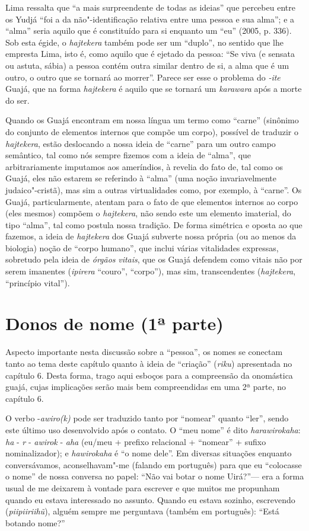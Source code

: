 Lima ressalta que ``a mais surpreendente de todas as ideias'' que percebeu
entre os Yudjá ``foi a da não"-identificação relativa entre uma pessoa e
sua alma''; e a ``alma'' seria aquilo que é constituído para si enquanto um
``eu'' (2005, p. 336). Sob esta égide, o \emph{hajtekera} também pode ser
um ``duplo'', no sentido que lhe empresta Lima, isto é, como aquilo que é
ejetado da pessoa: ``Se viva (e sensata ou astuta, sábia) a pessoa contém
outra similar dentro de si, a alma que é um outro, o outro que se
tornará ao morrer''. Parece ser esse o problema do \emph{-ite} Guajá, que
na forma \emph{hajtekera} é aquilo que se tornará um \emph{karawara}
após a morte do ser.

Quando os Guajá encontram em nossa língua um termo como ``carne''
(sinônimo do conjunto de elementos internos que compõe um corpo),
possível de traduzir o \emph{hajtekera}, estão deslocando a nossa ideia
de ``carne'' para um outro campo semântico, tal como nós sempre fizemos
com a ideia de ``alma'', que arbitrariamente imputamos aos ameríndios, à
revelia do fato de, tal como os Guajá, eles não estarem se referindo à
``alma'' (uma noção invariavelmente judaico"-cristã), mas sim a outras
virtualidades como, por exemplo, à ``carne''. Os Guajá, particularmente,
atentam para o fato de que elementos internos ao corpo (eles mesmos)
compõem o \emph{hajtekera}, não sendo este um elemento imaterial, do
tipo ``alma'', tal como postula nossa tradição. De forma simétrica e
oposta ao que fazemos, a ideia de \emph{hajtekera} dos Guajá subverte
nossa própria (ou ao menos da biologia) noção de ``corpo humano'', que
inclui várias vitalidades expressas, sobretudo pela ideia de
\emph{órgãos} \emph{vitais}, que os Guajá defendem como vitais não por
serem imanentes (\emph{ipirera} ``couro'', ``corpo''), mas sim,
transcendentes (\emph{hajtekera}, ``princípio vital'').

\section{Donos de nome (1ª parte)}

Aspecto importante nesta discussão sobre a ``pessoa'', os nomes se
conectam tanto ao tema deste capítulo quanto à ideia de ``criação''
(\emph{riku}) apresentada no capítulo 6. Desta forma, trago aqui esboços
para a compreensão da onomástica guajá, cujas implicações serão mais bem
compreendidas em uma 2ª parte, no capítulo 6.

O verbo -\emph{awiro(k)} pode ser traduzido tanto por ``nomear'' quanto
``ler'', sendo este último uso desenvolvido após o contato. O ``meu
nome'' é dito \emph{harawirokaha}: \emph{ha} - \emph{r} - \emph{awirok}
- \emph{aha} (eu/meu + prefixo relacional + ``nomear'' + sufixo
nominalizador); e \emph{hawirokaha} é ``o nome dele''. Em diversas
situações enquanto conversávamos, aconselhavam"-me (falando em português)
para que eu ``colocasse o nome'' de nossa conversa no papel: ``Não vai
botar o nome Uirá?''--- era a forma usual de me deixarem à vontade para
escrever e que muitos me propunham quando eu estava interessado no
assunto. Quando eu estava sozinho, escrevendo (\emph{piipiiriihũ}),
alguém sempre me perguntava (também em português): ``Está botando
nome?''

